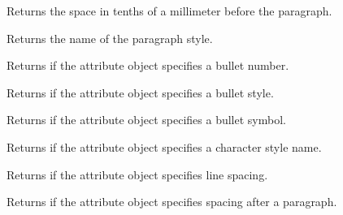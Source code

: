\label{wxtextattrexgetparagraphspacingbefore}


Returns the space in tenths of a millimeter before the paragraph.

\label{wxtextattrexgetparagraphstylename}


Returns the name of the paragraph style.

\label{wxtextattrexhasbulletnumber}


Returns \true if the attribute object specifies a bullet number.

\label{wxtextattrexhasbulletstyle}


Returns \true if the attribute object specifies a bullet style.

\label{wxtextattrexhasbulletsymbol}


Returns \true if the attribute object specifies a bullet symbol.

\label{wxtextattrexhascharacterstylename}


Returns \true if the attribute object specifies a character style name.

\label{wxtextattrexhaslinespacing}


Returns \true if the attribute object specifies line spacing.

\label{wxtextattrexhasparagraphspacingafter}


Returns \true if the attribute object specifies spacing after a paragraph.

\label{wxtextattrexhasparagraphspacingbefore}

